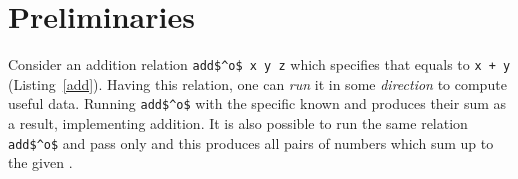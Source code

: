 \section{Preliminaries}

Consider an addition relation \lstinline{add$^o$ x y z} which specifies that \z equals to \lstinline{x + y} (Listing~\ref{add}).
Having this relation, one can \emph{run} it in some \emph{direction} to compute useful data.
Running \lstinline{add$^o$} with the specific known \x and \y produces their sum as a result, implementing addition.
It is also possible to run the same relation \lstinline{add$^o$} and pass only \z and this produces all pairs of numbers which sum up to the given \z.